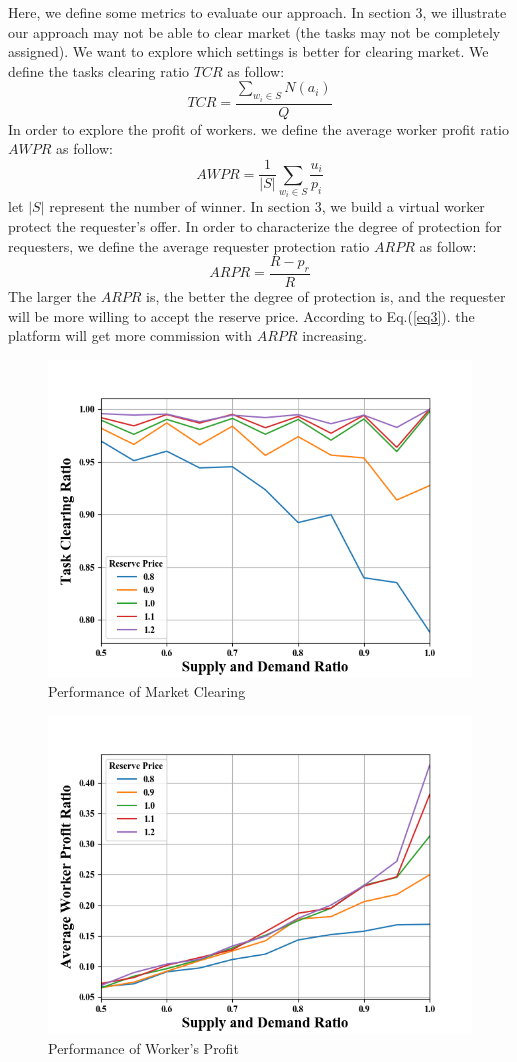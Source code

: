 Here, we define some metrics to evaluate our approach. In section 3, we illustrate our approach may not be able to clear market (the tasks may not be completely assigned). We want to explore which settings is better for clearing market. We define the tasks clearing ratio $TCR$ as follow:
\begin{equation}\label{eq12}
  TCR = \frac{\sum_{w_i \in S} N(a_i)}{Q}
\end{equation}
In order to explore the profit of workers. we define the average worker profit ratio $AWPR$ as follow:
\begin{equation}\label{eq13}
  AWPR = \frac{1}{|S|}\sum_{w_i \in S}\frac{u_i}{p_i}
\end{equation}
let $|S|$ represent the number of winner. In section 3, we build a virtual worker protect the requester's offer. In order to characterize the degree of protection for requesters, we define the average requester protection ratio $ARPR$ as follow:
\begin{equation}\label{eq14}
  ARPR = \frac{R - p_r}{R}
\end{equation}
The larger the $ARPR$ is, the better the degree of protection is, and the requester will be more willing to accept the reserve price. According to Eq.(\ref{eq3}). the platform will get more commission with $ARPR$ increasing.
\begin{figure}
  \centering
  \includegraphics[width=0.6\linewidth]{performance1.png}
  \caption{Performance of Market Clearing}\label{img2}
\end{figure}

\begin{figure}
  \centering
  \includegraphics[width=0.6\linewidth]{performance2.png}
  \caption{Performance of Worker's Profit}\label{img3}
\end{figure}

